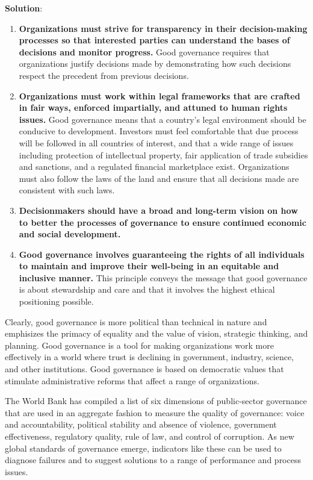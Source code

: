\documentclass[
]{book}
\newenvironment{solution}{ {\bfseries Solution}:}{}
\begin{document}
\begin{questions}
\begin{solution}
\begin{enumerate}
\item \textbf{Organizations must strive for transparency in their decision-making processes so that interested parties can understand the bases of decisions and monitor progress.} Good governance requires that organizations justify decisions made by demonstrating how such decisions respect the precedent from previous decisions.
\item \textbf{Organizations must work within legal frameworks that are crafted in fair ways, enforced impartially, and attuned to human rights issues.} Good governance means that a country’s legal environment should be conducive to development. Investors must feel comfortable that due process will be followed in all countries of interest, and that a wide range of issues including protection of intellectual property, fair application of trade subsidies and sanctions, and a regulated financial marketplace exist. Organizations must also follow the laws of the land and ensure that all decisions made are consistent with such laws.
\item \textbf{Decisionmakers should have a broad and long-term vision on how to better the processes of governance to ensure continued economic and social development.}
\item \textbf{Good governance involves guaranteeing the rights of all individuals to maintain and improve their well-being in an equitable and inclusive manner.} This principle conveys the message that good governance is about stewardship and care and that it involves the highest ethical positioning possible.
\end{enumerate}

Clearly, good governance is more political than technical in nature and emphisizes the primacy of equality and the value of vision, strategic thinking, and planning. Good governance is a tool for making organizations work more effectively in a world where trust is declining in government, industry, science, and other institutions. Good governance is based on democratic values that stimulate administrative reforms that affect a range of organizations.

The World Bank has compiled a list of six dimensions of public-sector governance that are used in an aggregate fashion to measure the quality of governance: voice and accountability, political stability and absence of violence, government effectiveness, regulatory quality, rule of law, and control of corruption. As new global standards of governance emerge, indicators like these can be used to diagnose failures and to suggest solutions to a range of performance and process issues.


\end{solution}
\end{questions}
\end{document}
